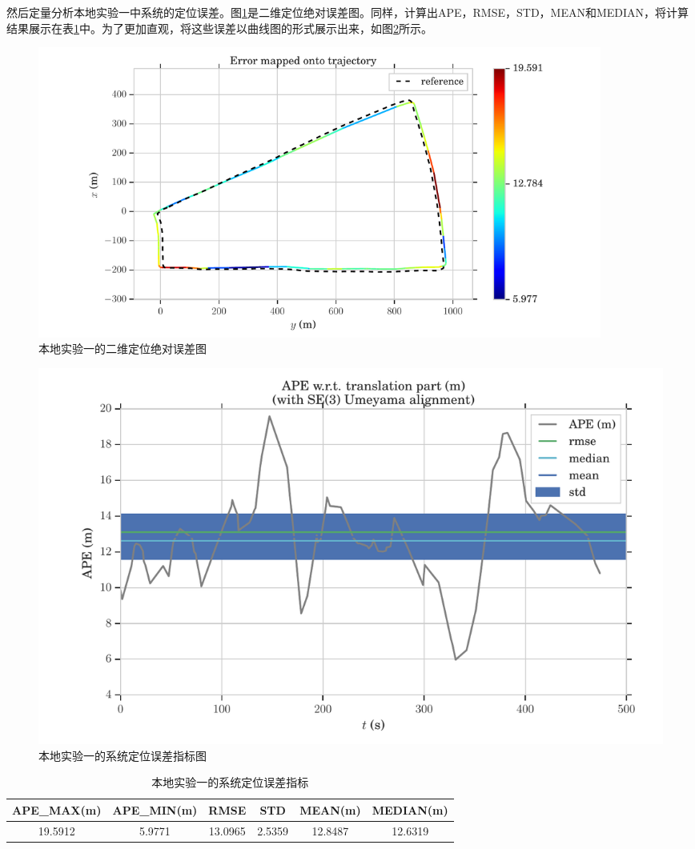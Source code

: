 然后定量分析本地实验一中系统的定位误差。图\ref{fig5_17}是二维定位绝对误差图。同样，计算出APE，RMSE，STD，MEAN和MEDIAN，将计算结果展示在表\ref{tab:5.3}中。为了更加直观，将这些误差以曲线图的形式展示出来，如图\ref{fig5_18}所示。\newpage
\begin{figure}[!h]\setlength{\belowcaptionskip}{-12pt}
	\centering
	\includegraphics[width=0.90\textwidth]{figures/chapter5/ape_map_3km}
	\caption{本地实验一的二维定位绝对误差图}\label{fig5_17}
\end{figure}\newpage
\begin{figure}[!h]\setlength{\belowcaptionskip}{-12pt}
	\centering
	\includegraphics[width=1.0\textwidth]{figures/chapter5/ape_err_3km}
	\caption{本地实验一的系统定位误差指标图}\label{fig5_18}
\end{figure}
\begin{table}[!h]\setlength{\abovecaptionskip}{6pt}
	\centering
	\caption{本地实验一的系统定位误差指标} \label{tab:5.3}
	\begin{tabular*}{0.9\textwidth}{@{\extracolsep{\fill}}cccccc}
		\toprule
		APE\_MAX(m)&APE\_MIN(m) &RMSE	&STD	&MEAN(m)	&MEDIAN(m) \\
		\midrule
		19.5912	 &5.9771	&13.0965	&2.5359	 &12.8487	&12.6319 \\
		\bottomrule
	\end{tabular*}
\end{table}

